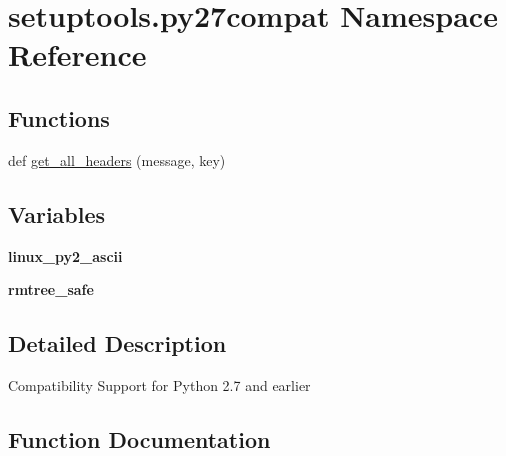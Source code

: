 \hypertarget{namespacesetuptools_1_1py27compat}{}\section{setuptools.\+py27compat Namespace Reference}
\label{namespacesetuptools_1_1py27compat}
\subsection*{Functions}
\begin{DoxyCompactItemize}
\item 
def \hyperlink{namespacesetuptools_1_1py27compat_ac25365180a68bc60bacc66eb0c05f4b6}{get\+\_\+all\+\_\+headers} (message, key)
\end{DoxyCompactItemize}
\subsection*{Variables}
\begin{DoxyCompactItemize}
\item 
\mbox{\label{namespacesetuptools_1_1py27compat_a912c50345c3f3d790e9eee5f0d1d233a}} 
{\bfseries linux\+\_\+py2\+\_\+ascii}
\item 
\mbox{\label{namespacesetuptools_1_1py27compat_a1377100256806b1ad37b42dc1ac7797d}} 
{\bfseries rmtree\+\_\+safe}
\end{DoxyCompactItemize}


\subsection{Detailed Description}
\begin{DoxyVerb}Compatibility Support for Python 2.7 and earlier
\end{DoxyVerb}
 

\subsection{Function Documentation}
\mbox{\label{namespacesetuptools_1_1py27compat_ac25365180a68bc60bacc66eb0c05f4b6}} 
